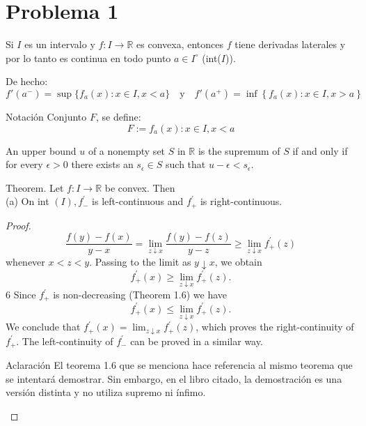 \section{Problema 1}

Si $I$ es un intervalo y $f:I\to\mathbb{R}$ es convexa, entonces $f$ tiene derivadas laterales y por lo tanto es continua en todo punto $a\in I^{\circ}$ (int($I$)). 
\newline

De hecho: 
$$f'(a^-)=\sup\{f_a(x):x\in I, x<a\} \quad \text{y} \quad f'(a^+)=\inf\left\{f_a(x):x\in I,x>a\right\}$$

\begin{noter}{Notación}
	Conjunto $F$, se define:
	$$F:=f_a(x):x\in I, x<a$$
\end{noter}
\begin{tcolorbox}[colback=gray!15,colframe=gray!1!gray,title=Lema 2.3.4 de \cite{bartle2000introduction} ]
	An upper bound $u$ of a nonempty set $S$ in $\mathbb{R}$ is the supremum of $S$ if and only if for every $\epsilon>0$ there exists an $s_\epsilon\in S$ such that $u-\epsilon<s_\epsilon$.
\end{tcolorbox}
\begin{tcolorbox}[colback=gray!15,colframe=gray!1!gray,title=Teorema 1.7 de \cite{tiel1984convex}]
Theorem. Let $f: I \rightarrow \mathbb{R}$ be convex. Then\\
(a) On int $(I), f_{-}^{\prime}$ is left-continuous and $f_{+}^{\prime}$ is right-continuous.

	
	\begin{proof}
		
		$$
		\frac{f(y)-f(x)}{y-x}=\lim _{z \downarrow x} \frac{f(y)-f(z)}{y-z} \geqslant \lim _{z \downarrow x} f_{+}^{\prime}(z)
		$$
		whenever $x<z<y$. Passing to the limit as $y \downarrow x$, we obtain
		$$
		f_{+}^{\prime}(x) \geqslant \lim _{z \downarrow x} f_{+}^{\prime}(z) .
		$$
		6
		Since $f_{+}^{\prime}$ is non-decreasing (Theorem 1.6) we have
		$$
		f_{+}^{\prime}(x) \leqslant \lim _{z \downarrow x} f_{+}^{\prime}(z) .
		$$
		We conclude that $f_{+}^{\prime}(x)=\lim _{z \downarrow x} f_{+}^{\prime}(z)$, which proves the right-continuity of $f_{+}^{\prime} .$ The left-continuity of $f_{-}^{\prime}$ can be proved in a similar way.
		
		\begin{noter}{Aclaración}
			El teorema 1.6 que se menciona hace referencia al mismo teorema que se intentará demostrar. Sin embargo, en el libro citado, la demostración es una versión distinta y no utiliza supremo ni ínfimo.
		\end{noter}
	\end{proof}
	
\end{tcolorbox}

